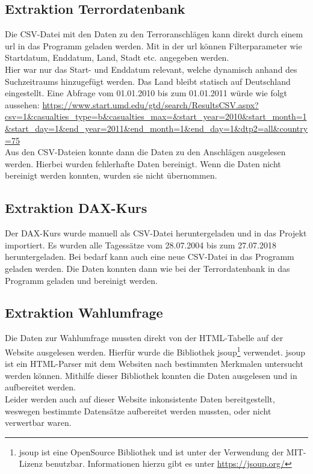 \documentclass[a4paper,10pt,parskip]{article}
\begin{document}
\subsection{Extraktion Terrordatenbank}
Die CSV-Datei mit den Daten zu den Terroranschlägen kann direkt durch einem \ac{url} in das Programm geladen werden. Mit in der \ac{url} können Filterparameter wie Startdatum, Enddatum, Land, Stadt etc. angegeben werden.\\
Hier war nur das Start- und Enddatum relevant, welche dynamisch anhand des Suchzeitraums hinzugefügt werden. Das Land bleibt statisch auf Deutschland eingestellt.
Eine Abfrage vom 01.01.2010 bis zum 01.01.2011 würde wie folgt aussehen: \url{https://www.start.umd.edu/gtd/search/ResultsCSV.aspx?csv=1&casualties_type=b&casualties_max=&start_year=2010&start_month=1&start_day=1&end_year=2011&end_month=1&end_day=1&dtp2=all&country=75}
\\
Aus den CSV-Dateien konnte dann die Daten zu den Anschlägen ausgelesen werden. Hierbei wurden fehlerhafte Daten bereinigt. Wenn die Daten nicht bereinigt werden konnten, wurden sie nicht übernommen.
\subsection{Extraktion DAX-Kurs}
Der DAX-Kurs wurde manuell als CSV-Datei heruntergeladen und in das Projekt importiert. Es wurden alle Tagessätze vom 28.07.2004 bis zum 27.07.2018 heruntergeladen. Bei bedarf kann auch eine neue CSV-Datei in das Programm geladen werden.
Die Daten konnten dann wie bei der Terrordatenbank in das Programm geladen und bereinigt werden.\\
\subsection{Extraktion Wahlumfrage}
Die Daten zur Wahlumfrage mussten direkt von der HTML-Tabelle auf der Website ausgelesen werden. Hierfür wurde die Bibliothek jsoup\footnote{jsoup ist eine OpenSource Bibliothek und ist unter der Verwendung der MIT-Lizenz benutzbar. Informationen hierzu gibt es unter \url{https://jsoup.org/}} verwendet. jsoup ist ein HTML-Parser mit dem Websiten nach bestimmten Merkmalen untersucht werden können. Mithilfe dieser Bibliothek konnten die Daten ausgelesen und in aufbereitet werden.\\ Leider werden auch auf dieser Website inkonsistente Daten bereitgestellt, weswegen bestimmte Datensätze aufbereitet werden mussten, oder nicht verwertbar waren.
\end{document}
